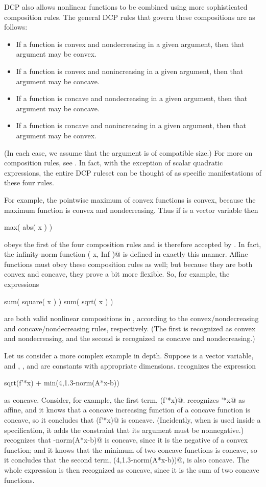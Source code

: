 \documentclass[12pt]{article}
\begin{document}
DCP also allows nonlinear functions to be combined using more
sophisticated composition rules. 
The general
DCP rules that govern these compositions are as follows:
\begin{itemize}
\item If a function is convex and nondecreasing in a given argument,
then that argument may be convex.
\item If a function is convex and nonincreasing in a given argument,
then that argument may be concave.
\item If a function is concave and nondecreasing in a given argument,
then that argument may be concave.
\item If a function is concave and nonincreasing in a given argument,
then that argument may be convex.
\end{itemize}
(In each case, we assume that the argument is of compatible size.)
For more on composition rules, see \cite[\S3.2.4]{BV:04}.
In fact, with the exception of scalar quadratic expressions,
the entire DCP ruleset can be thought of as specific manifestations
of these four rules.

For example, the pointwise maximum of convex functions is convex, because
the maximum function is convex and nondecreasing.
Thus if \verb@x@ is a vector variable then 
\begin{code}
	max( abs( x ) )
\end{code}
obeys the first of the four composition rules and is therefore accepted
by \cvx. In fact, the infinity-norm function \verb@norm( x, Inf )@
is defined in exactly this manner. 
Affine functions must obey these composition rules as well; but because they
are both convex and concave, they prove a bit more flexible. So, for example, 
the expressions
\begin{code}
	sum( square( x ) )
	sum( sqrt( x ) )
\end{code}
are both valid nonlinear compositions in \cvx, according to the 
convex/nondecreasing and concave/nondecreasing rules, respectively.
(The first is recognized as convex and nondecreasing, and the second
is recognized as concave and nondecreasing.)

Let us consider a more complex example in depth. Suppose
\verb@x@ is a vector variable, and
\verb@A@, \verb@b@, and \verb@f@ are 
constants with appropriate dimensions.  \cvx recognizes the
expression
\begin{code}
sqrt(f'*x) + min(4,1.3-norm(A*x-b))
\end{code}
as concave. Consider, for example, the first term, \verb@sqrt(f'*x)@.
\cvx recognizes \verb@f'*x@ as affine, and it knows that a concave
increasing function of a concave function is concave, so it
concludes that \verb@sqrt(f'*x)@ is concave.
(Incidently, when \verb@sqrt@ is used inside a \cvx specification,
it adds the constraint that its argument must
be nonnegative.)
\cvx recognizes that \verb@-norm(A*x-b)@ is concave,
since it is the negative of a convex function;
and it knows that the minimum of two concave functions is concave,
so it concludes that the second term,  \verb@min(4,1.3-norm(A*x-b))@,
is also concave.  The whole expression is then recognized as concave,
since it is the sum of two concave functions.
\end{document}
